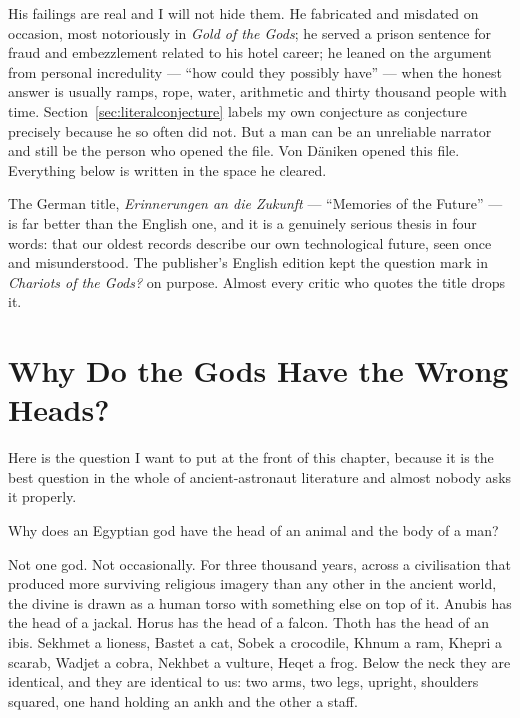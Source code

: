 His failings are real and I will not hide them. He fabricated and misdated on occasion, most
notoriously in \emph{Gold of the Gods}; he served a prison sentence for fraud and embezzlement
related to his hotel career; he leaned on the argument from personal incredulity --- ``how could
they possibly have'' --- when the honest answer is usually ramps, rope, water, arithmetic and
thirty thousand people with time. Section~\ref{sec:literalconjecture} labels my own conjecture as
conjecture precisely because he so often did not. But a man can be an unreliable narrator and
still be the person who opened the file. Von Däniken opened this file. Everything below is written
in the space he cleared.

\begin{funfact}
The German title, \emph{Erinnerungen an die Zukunft} --- ``Memories of the Future'' --- is far
better than the English one, and it is a genuinely serious thesis in four words: that our oldest
records describe our own technological future, seen once and misunderstood. The publisher's
English edition kept the question mark in \emph{Chariots of the Gods?} on purpose. Almost every
critic who quotes the title drops it.
\end{funfact}

\section{Why Do the Gods Have the Wrong Heads?}\label{sec:animalheads}

Here is the question I want to put at the front of this chapter, because it is the best
question in the whole of ancient-astronaut literature and almost nobody asks it properly.

Why does an Egyptian god have the head of an animal and the body of a man?

Not one god. Not occasionally. For three thousand years, across a civilisation that produced
more surviving religious imagery than any other in the ancient world, the divine is drawn as a
human torso with something else on top of it. Anubis has the head of a jackal. Horus has the
head of a falcon. Thoth has the head of an ibis. Sekhmet a lioness, Bastet a cat, Sobek a
crocodile, Khnum a ram, Khepri a scarab, Wadjet a cobra, Nekhbet a vulture, Heqet a frog. Below
the neck they are identical, and they are identical to us: two arms, two legs, upright, shoulders
squared, one hand holding an ankh and the other a staff. 

